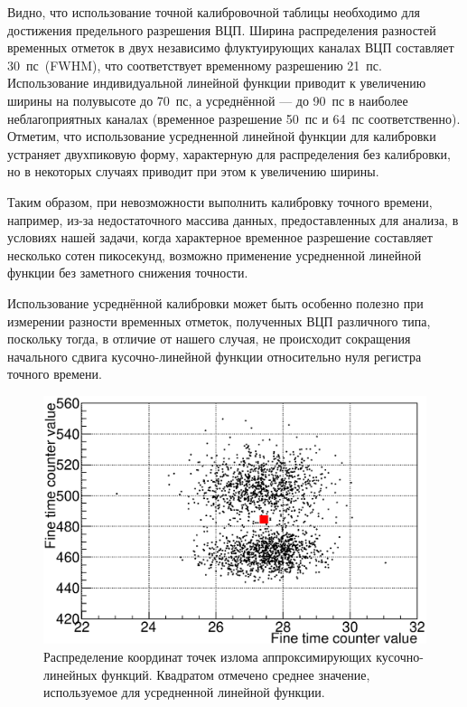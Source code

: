 Видно, что использование точной калибровочной таблицы необходимо для достижения предельного разрешения ВЦП. Ширина распределения разностей временных отметок в двух независимо флуктуирующих каналах ВЦП составляет 30~пс~(FWHM), что соответствует временному разрешению 21~пс. Использование индивидуальной линейной функции приводит к увеличению ширины на полувысоте до 70~пс, а усреднённой --- до 90~пс в наиболее неблагоприятных каналах (временное разрешение 50~пс и 64~пс соответственно). Отметим, что использование усредненной линейной функции для калибровки устраняет двухпиковую форму, характерную для распределения без калибровки, но в некоторых случаях приводит при этом к увеличению ширины.

Таким образом, при невозможности выполнить калибровку точного времени, например, из-за недостаточного массива данных, предоставленных для анализа, в условиях нашей задачи, когда характерное временное разрешение составляет несколько сотен пикосекунд, возможно применение усредненной линейной функции без заметного снижения точности.

Использование усреднённой калибровки может быть особенно полезно при измерении разности временных отметок, полученных ВЦП различного типа, поскольку тогда, в отличие от нашего случая, не происходит сокращения начального сдвига кусочно-линейной функции относительно нуля регистра точного времени.

\begin{figure}[H]
\centering
\includegraphics[width=1.0\textwidth]{pictures/19_ABmap.eps}
\caption{Распределение координат точек излома аппроксимирующих кусочно-линейных функций. Квадратом отмечено среднее значение, используемое для усредненной линейной функции.}
\label{fig:ABmap}
\end{figure}


